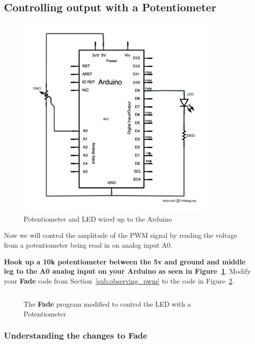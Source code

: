 \documentclass[11pt,a4paper]{article}
\begin{document}

\subsection{Controlling output with a Potentiometer} %
\label{sub:potentiometer}

\begin{figure}[htbp]
    \centering
        \includegraphics[height=4in]{figures/pot-fade.pdf}
    \caption{Potentiometer and LED wired up to the Arduino}
    \label{fig:figures_pot-fade}
\end{figure}

Now we will control the amplitude of the PWM signal by reading the voltage from a potentiometer being read in on analog input A0.

\textbf{Hook up a 10k potentiometer between the 5v and ground and middle leg to the A0 analog input on your Arduino as seen in Figure~\ref{fig:figures_pot-fade}}.  Modify your \textbf{Fade} code from Section~\ref{sub:observing_pwm}
 to the code in Figure~\ref{fig:fade_mod}.

\begin{figure}[htbp]
	\centering
\inputminted[mathescape,linenos,numbersep=5pt,gobble=0,frame=lines,framesep=2mm]{c}{code/pot_fade/pot_fade.ino}
	\caption{The \textbf{Fade} program modified to control the LED with a Potentiometer}
	\label{fig:fade_mod}
\end{figure}

\subsubsection{Understanding the changes to \textbf{Fade}} %
\label{ssub:understanding_the_changes_to_fade}
\end{document}

